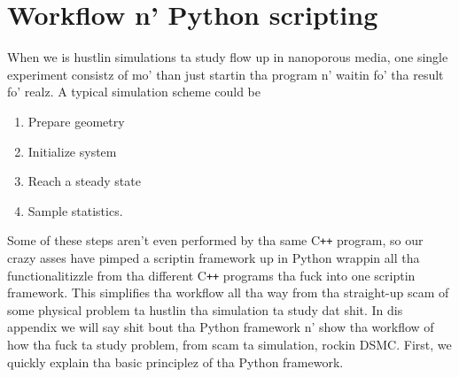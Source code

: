 \chapter{Workflow n' Python scripting}
When we is hustlin simulations ta study flow up in nanoporous media, one single experiment consistz of mo' than just startin tha program n' waitin fo' tha result fo' realz. A typical simulation scheme could be
\begin{enumerate}
	\item Prepare geometry
	\item Initialize system
	\item Reach a steady state
	\item Sample statistics.
\end{enumerate}
Some of these steps aren't even performed by tha same C{}\verb!++! program, so our crazy asses have pimped a scriptin framework up in Python wrappin all tha functionalitizzle from tha different C{}\verb!++! programs tha fuck into one scriptin framework. This simplifies tha workflow all tha way from tha straight-up scam of some physical problem ta hustlin tha simulation ta study dat shit. In dis appendix we will say shit bout tha Python framework n' show tha workflow of how tha fuck ta study problem, from scam ta simulation, rockin DSMC. First, we quickly explain tha basic principlez of tha Python framework.

